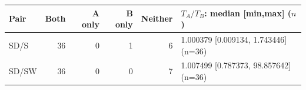 \begin{tabular}{lrrrrp{.35\linewidth}}
\toprule
Pair & Both & A only & B only & Neither & $T_A/T_B$: median [min,max] ($n$)\\\midrule
SD/S & 36 & 0 & 1 & 6 & 1.000379 [0.009134, 1.743446] (n=36)\\
SD/SW & 36 & 0 & 0 & 7 & 1.007499 [0.787373, 98.857642] (n=36)\\
\bottomrule
\end{tabular}
